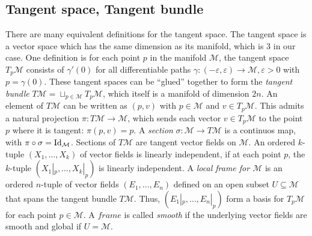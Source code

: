 \documentclass[../thesis.tex]{subfiles}
\begin{document}
\subsection{Tangent space, Tangent bundle} There are many equivalent definitions
for the tangent space. The tangent space is a vector space which has the same dimension as its manifold,
which is 3 in our case.
One definition is for each point $p$ in the manifold $\mathcal{M}$,
the tangent space $T_p\mathcal{M}$ consists of $\gamma'(0)$ for all differentiable paths ${\gamma: (-\varepsilon, \varepsilon) \to \mathcal{M}, \varepsilon > 0}$
with $p = \gamma(0)$.
These tangent spaces can be ``glued'' together to form the
\emph{tangent bundle} $T\mathcal{M} = \sqcup _{p \in \mathcal{M}}T_p\mathcal{M}$, which itself
is a manifold of dimension $2n$. An element of $T\mathcal{M}$ can be written
as $(p,v)$ with $p \in \mathcal{M}$ and $v \in T_p\mathcal{M}$. This admits a natural projection $\pi : T\mathcal{M} \to \mathcal{M}$,
which sends each vector $v \in T_p\mathcal{M}$ to the point $p$ where it is tangent: $\pi(p,v)=p$.
A \emph{section} $\sigma: \mathcal{M} \to T\mathcal{M}$ is a continuos map, with $\pi \circ \sigma = \operatorname{Id}_{\mathcal{M}}$.
Sections of $T\mathcal{M}$ are tangent vector fields on $\mathcal{M}$.
An ordered $k$-tuple $(X_1, \dots, X_k)$ of vector fields is linearly independent,
if at each point $p$, the $k$-tuple $(X_1|_p, \dots, X_k|_p)$ is linearly independent.
A \emph{local frame for $\mathcal{M}$} is an ordered $n$-tuple of vector fields $(E_1, ..., E_n)$
defined on an open subset $U\subseteq \mathcal{M}$
that spans the tangent bundle $T\mathcal{M}$. Thus, $(E_1|_p,\dots, E_n|_p)$ form
a basis for $T_p\mathcal{M}$ for each point $p\in \mathcal{M}$.
A $frame$ is called \emph{smooth} if the underlying vector fields are smooth and global if $U = \mathcal{M}$.
\end{document}
